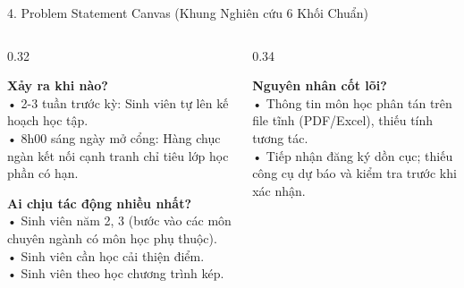 \documentclass[aspectratio=169, 10pt]{beamer}
\begin{document}
\begin{frame}{4. Problem Statement Canvas (Khung Nghiên cứu 6 Khối Chuẩn)}
    \begin{columns}[T]
        \begin{column}{0.32\textwidth}
            \begin{tcolorbox}[colback=CardBg, colframe=ThemeNavy, title=1. CONTEXT (Bối cảnh)]
                \scriptsize
                \textbf{Xảy ra khi nào?}\\
                • 2-3 tuần trước kỳ: Sinh viên tự lên kế hoạch học tập.\\
                • 8h00 sáng ngày mở cổng: Hàng chục ngàn kết nối cạnh tranh chỉ tiêu lớp học phần có hạn.
            \end{tcolorbox}
            
            \vspace{0.08cm}
            \begin{tcolorbox}[colback=CardBg, colframe=ThemeNavy, title=4. CUSTOMERS (Đối tượng)]
                \scriptsize
                \textbf{Ai chịu tác động nhiều nhất?}\\
                • Sinh viên năm 2, 3 (bước vào các môn chuyên ngành có môn học phụ thuộc).\\
                • Sinh viên cần học cải thiện điểm.\\
                • Sinh viên theo học chương trình kép.
            \end{tcolorbox}
        \end{column}

        \begin{column}{0.34\textwidth}
            \begin{tcolorbox}[colback=CardBg, colframe=WarmAmber, title=2. PROBLEM (Vấn đề \& Gốc rễ)]
                \scriptsize
                \textbf{Nguyên nhân cốt lõi?}\\
                • Thông tin môn học phân tán trên file tĩnh (PDF/Excel), thiếu tính tương tác.\\
                • Tiếp nhận đăng ký dồn cục; thiếu công cụ dự báo và kiểm tra trước khi xác nhận.
            \end{tcolorbox}
            

\end{column}
\end{columns}
\end{frame}
\end{document}
